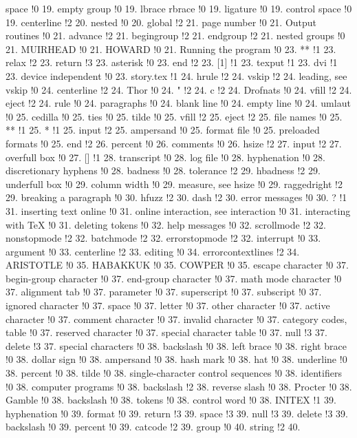 space !0 19.
empty group !0 19.
lbrace rbrace !0 19.
ligature !0 19.
control space !0 19.
centerline !2 20.
nested !0 20.
global !2 21.
page number !0 21.
Output routines !0 21.
advance !2 21.
begingroup !2 21.
endgroup !2 21.
nested groups !0 21.
MUIRHEAD !0 21.
HOWARD !0 21.
Running the program !0 23.
** !1 23.
relax !2 23.
return !3 23.
asterisk !0 23.
end !2 23.
[1] !1 23.
texput !1 23.
dvi !1 23.
device independent !0 23.
story.tex !1 24.
hrule !2 24.
vskip !2 24.
leading, see vskip !0 24.
centerline !2 24.
Thor !0 24.
" !2 24.
c !2 24.
Drofnats !0 24.
vfill !2 24.
eject !2 24.
rule !0 24.
paragraphs !0 24.
blank line !0 24.
empty line !0 24.
umlaut !0 25.
cedilla !0 25.
ties !0 25.
tilde !0 25.
vfill !2 25.
eject !2 25.
file names !0 25.
** !1 25.
* !1 25.
input !2 25.
ampersand !0 25.
format file !0 25.
preloaded formats !0 25.
end !2 26.
percent !0 26.
comments !0 26.
hsize !2 27.
input !2 27.
overfull box !0 27.
[] !1 28.
transcript !0 28.
log file !0 28.
hyphenation !0 28.
discretionary hyphens !0 28.
badness !0 28.
tolerance !2 29.
hbadness !2 29.
underfull box !0 29.
column width !0 29.
measure, see hsize !0 29.
raggedright !2 29.
breaking a paragraph !0 30.
hfuzz !2 30.
dash !2 30.
error messages !0 30.
? !1 31.
inserting text online !0 31.
online interaction, see interaction !0 31.
interacting with TeX !0 31.
deleting tokens !0 32.
help messages !0 32.
scrollmode !2 32.
nonstopmode !2 32.
batchmode !2 32.
errorstopmode !2 32.
interrupt !0 33.
argument !0 33.
centerline !2 33.
editing !0 34.
errorcontextlines !2 34.
ARISTOTLE !0 35.
HABAKKUK !0 35.
COWPER !0 35.
escape character !0 37.
begin-group character !0 37.
end-group character !0 37.
math mode character !0 37.
alignment tab !0 37.
parameter !0 37.
superscript !0 37.
subscript !0 37.
ignored character !0 37.
space !0 37.
letter !0 37.
other character !0 37.
active character !0 37.
comment character !0 37.
invalid character !0 37.
category codes, table !0 37.
reserved character !0 37.
special character table !0 37.
null !3 37.
delete !3 37.
special characters !0 38.
backslash !0 38.
left brace !0 38.
right brace !0 38.
dollar sign !0 38.
ampersand !0 38.
hash mark !0 38.
hat !0 38.
underline !0 38.
percent !0 38.
tilde !0 38.
single-character control sequences !0 38.
identifiers !0 38.
computer programs !0 38.
backslash !2 38.
reverse slash !0 38.
Procter !0 38.
Gamble !0 38.
backslash !0 38.
tokens !0 38.
control word !0 38.
INITEX !1 39.
hyphenation !0 39.
format !0 39.
return !3 39.
space !3 39.
null !3 39.
delete !3 39.
backslash !0 39.
percent !0 39.
catcode !2 39.
group !0 40.
string !2 40.
